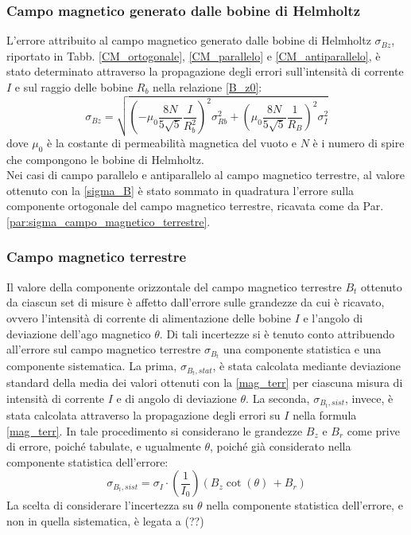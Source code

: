 \documentclass[]{article}
\begin{document}
    \subsubsection{Campo magnetico generato dalle bobine di Helmholtz}
    L'errore attribuito al campo magnetico generato dalle bobine di Helmholtz $\sigma _{Bz} $, riportato in Tabb. \ref{CM_ortogonale}, \ref{CM_parallelo} e \ref{CM_antiparallelo}, è stato determinato attraverso la propagazione degli errori sull'intensità di corrente $I$ e sul raggio delle bobine $R_b$ nella relazione \ref{B_z0}:
    \begin{equation}
        \label{sigma_B}
        \sigma _{Bz} = \sqrt{\left(- \mu _0 \frac{8 N}{5\sqrt{5}} \frac{I}{R_b^2}\right)^2 \sigma_{Rb}^2 + \left(\mu _0 \frac{8 N}{5\sqrt{5}} \frac{1}{R_B} \right)^2 \sigma _I ^2} 
    \end{equation}
    dove $\mu _0 $ è la costante di permeabilità magnetica del vuoto e $N$ è i numero di spire che compongono le bobine di Helmholtz. \\
    Nei casi di campo parallelo e antiparallelo al campo magnetico terrestre, al valore ottenuto con la \ref{sigma_B} è stato sommato in quadratura l'errore sulla componente ortogonale del campo magnetico terrestre, ricavata come da Par. \ref{par:sigma_campo_magnetico_terrestre}.


    \subsubsection{Campo magnetico terrestre}
    Il valore della componente orizzontale del campo magnetico terrestre $B_t$ ottenuto da ciascun set di misure è affetto dall'errore sulle grandezze da cui è ricavato, ovvero l'intensità di corrente di alimentazione delle bobine $I$ e l'angolo di deviazione dell'ago magnetico $\theta$. Di tali incertezze si è tenuto conto attribuendo all'errore sul campo magnetico terrestre $\sigma_{B_t}$ una componente statistica e una componente sistematica. La prima, $\sigma_{B_t,stat}$, è stata calcolata mediante deviazione standard della media dei valori ottenuti con la \ref{mag_terr} per ciascuna misura di intensità di corrente $I$ e di angolo di deviazione $\theta$.
    La seconda, $\sigma_{B_t,sist}$, invece, è stata calcolata attraverso la propagazione degli errori su $I$ nella formula \ref{mag_terr}. In tale procedimento si considerano le grandezze $B_z$ e $B_r$ come prive di errore, poiché tabulate, e ugualmente $\theta$, poiché già considerato nella componente statistica dell'errore:
    \begin{equation}
        \label{sigma_Bt_sist}
        \sigma_{B_t,sist} = \sigma_I \cdot \left(\frac{1}{I_0}\right) (B_z \cot(\theta) \, + B_r)
    \end{equation}
    La scelta di considerare l'incertezza su $\theta$ nella componente statistica dell'errore, e non in quella sistematica, è legata a (??)
    
\end{document}
